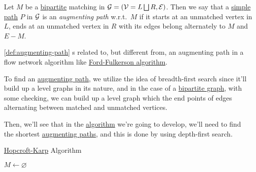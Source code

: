 \begin{definition}\label{def:augmenting-path}
	Let \(M\) be a \href{https://en.wikipedia.org/wiki/Bipartite_graph}{bipartite} matching in \(\mathcal{\MakeUppercase{g}} = (\mathcal{\MakeUppercase{v}} = L \bigsqcup  R, \mathcal{\MakeUppercase{E}})\). Then we say that a \hyperref[def:simple-path]{simple path} \(P\) in \(\mathcal{\MakeUppercase{g}} \) is an \emph{augmenting path} w.r.t.\ \(M\) if it starts at an unmatched vertex in \(L\), ends at an unmatched vertex in \(R\) with its edges belong alternately to \(M\) and \(E - M\).
\end{definition}

\begin{note}
	\autoref{def:augmenting-path} s related to, but different from, an augmenting path in a flow network algorithm like \href{https://en.wikipedia.org/wiki/Ford%E2%80%93Fulkerson_algorithm}{Ford-Fulkerson algorithm}.
\end{note}

\begin{intuition}
	To find an \hyperref[def:augmenting-path]{augmenting path}, we utilize the idea of breadth-first search since it'll build up a level graphs in its nature, and in the case of a \href{https://en.wikipedia.org/wiki/Bipartite_graph}{bipartite graph}, with some checking, we can build up a level graph which the end points of edges alternating between matched and unmatched vertices.
\end{intuition}

Then, we'll see that in the \hyperref[algo:Hopcroft-Karp-algorithm]{algorithm} we're going to develop, we'll need to find the shortest \hyperref[def:augmenting-path]{augmenting paths}, and this is done by using depth-first search.

\begin{algorithm}[H]\label{algo:Hopcroft-Karp-algorithm}
	\DontPrintSemicolon
	\caption{\href{https://en.wikipedia.org/wiki/Hopcroft-Karp_algorithm}{Hopcroft-Karp} Algorithm}
	\BlankLine

	\(M\gets \varnothing \)
\end{algorithm}

